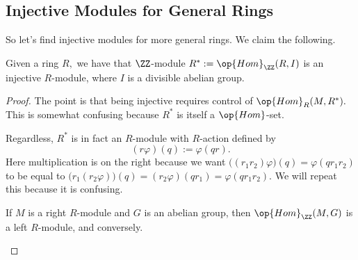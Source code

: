 \subsection{Injective Modules for General Rings}
So let's find injective modules for more general rings. We claim the following.
\begin{proposition} \label{prop:injecexist}
	Given a ring $R,$ we have that $\ZZ$-module $R^*:=\op{Hom}_\ZZ(R,I)$ is an injective $R$-module, where $I$ is a divisible abelian group.
\end{proposition}
\begin{proof}
	The point is that being injective requires control of $\op{Hom}_R(M,R^*).$ This is somewhat confusing because $R^*$ is itself a $\op{Hom}$-set.

	Regardless, $R^*$ is in fact an $R$-module with $R$-action defined by
	\[(r\varphi)(q):=\varphi(qr).\]
	Here multiplication is on the right because we want $\big((r_1r_2)\varphi\big)(q)=\varphi(qr_1r_2)$ to be equal to $\big(r_1(r_2\varphi)\big)(q)=(r_2\varphi)(qr_1)=\varphi(qr_1r_2).$ We will repeat this because it is confusing.
	\begin{warn}
		If $M$ is a right $R$-module and $G$ is an abelian group, then $\op{Hom}_\ZZ(M,G)$ is a left $R$-module, and conversely.
	\end{warn}
	

\end{proof}
